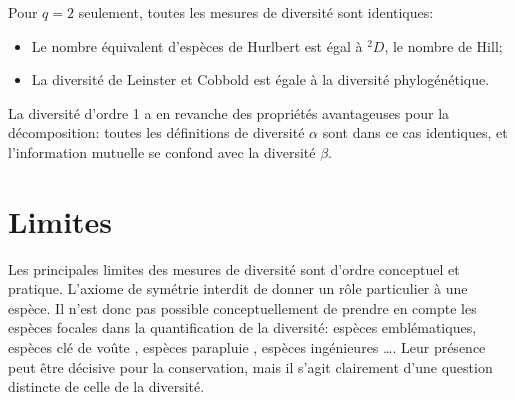 \documentclass[
  11pt,
  french,
  a4paper,
  extrafontsizes,onecolumn,openright
  ]{memoir}
\providecommand{\tightlist}{%
  \setlength{\itemsep}{0pt}\setlength{\parskip}{0pt}}
\begin{document}
Pour \(q=2\) seulement, toutes les mesures de diversité sont identiques:

\begin{itemize}
\tightlist
\item
  Le nombre équivalent d'espèces de Hurlbert est égal à \(^{2}\!D\), le nombre de Hill;
\item
  La diversité de Leinster et Cobbold est égale à la diversité phylogénétique.
\end{itemize}

La diversité d'ordre 1 a en revanche des propriétés avantageuses pour la décomposition: toutes les définitions de diversité \(\alpha\) sont dans ce cas identiques, et l'information mutuelle se confond avec la diversité \(\beta\).

\section{Limites}\label{limites}

Les principales limites des mesures de diversité sont d'ordre conceptuel et pratique.
L'axiome de symétrie interdit de donner un rôle particulier à une espèce.
Il n'est donc pas possible conceptuellement de prendre en compte les espèces focales \autocite{Zacharias2001} dans la quantification de la diversité: espèces emblématiques, espèces clé de voûte \autocite{Paine1969}, espèces parapluie \autocite{Roberge2004}, espèces ingénieures \autocite{Jones1994}\ldots.
Leur présence peut être décisive pour la conservation, mais il s'agit clairement d'une question distincte de celle de la diversité.
\end{document}

